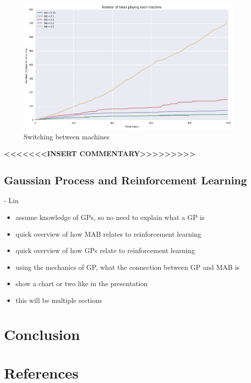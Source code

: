 \documentclass{article}
\begin{document}
\begin{figure}[H]
\centering
\includegraphics[scale=0.5]{UCB_num_plays.png}
\caption{Switching between machines}
\end{figure}

\textbf{<<<<<<<INSERT COMMENTARY>>>>>>>>>}


\subsection{Gaussian Process and Reinforcement Learning}

- Lin
\begin{itemize}
\item assume knowledge of GPs, so no need to explain what a GP is
\item quick overview of how MAB relates to reinforcement learning
\item quick overview of how GPs relate to reinforcement learning
\item using the mechanics of GP, what the connection between GP and MAB is
\item show a chart or two like in the presentation
\item this will be multiple sections
\end{itemize}

\section{Conclusion}

\section{References}
\end{document}
